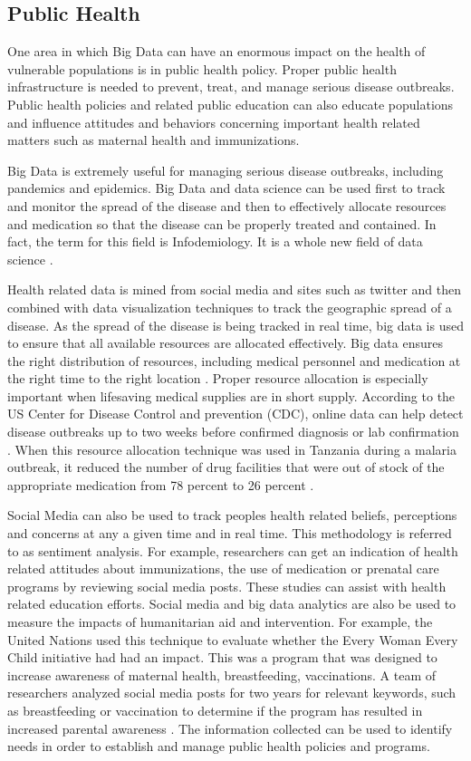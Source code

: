 \documentclass[sigconf]{acmart}
\begin{document}
\subsection{Public Health}
One area in which Big Data can have an enormous impact on the health of vulnerable populations is in public health policy. Proper public health infrastructure is needed to prevent, treat, and manage serious disease outbreaks. Public health policies and related public education can also educate populations and influence attitudes and behaviors concerning important health related matters such as maternal health and immunizations. 

Big Data is extremely useful for managing serious disease outbreaks, including pandemics and epidemics. Big Data and data science can be used first to track and monitor the spread of the disease and then to effectively allocate resources and medication so that the disease can be properly treated and contained. In fact, the term for this field is Infodemiology. It is a whole new field of data science \cite{www-google-GloPls}.

Health related data is mined from social media and sites such as twitter and then combined with data visualization techniques to track the geographic spread of a disease. As the spread of the disease is being tracked in real time, big data is used to ensure that all available resources are allocated effectively. Big data ensures the right distribution of resources, including medical personnel and medication at the right time to the right location \cite{www-google-Dataflo}. Proper resource allocation is especially important when lifesaving medical supplies are in short supply. According to the US Center for Disease Control and prevention (CDC), online data can help detect disease outbreaks up to two weeks before confirmed diagnosis or lab confirmation \cite{www-google-GloPls}.  When this resource allocation technique was used in Tanzania during a malaria outbreak, it reduced the number of drug facilities that were out of stock of the appropriate medication from 78 percent to 26 percent \cite{DevEcon}.

Social Media can also be used to track peoples health related beliefs, perceptions and concerns at any a given time and in real time. This methodology is referred to as sentiment analysis. For example, researchers can get an indication of health related attitudes about immunizations, the use of medication or prenatal care programs by reviewing social media posts.  These studies can assist with health related education efforts. Social media and big data analytics are also be used to measure the impacts of humanitarian aid and intervention. For example, the United Nations used this technique to evaluate whether the Every Woman Every Child initiative had had an impact. This was a program that was designed to increase awareness of maternal health, breastfeeding, vaccinations. A team of researchers analyzed social media posts for two years for relevant keywords, such as breastfeeding or vaccination to determine if the program has resulted in increased parental awareness \cite{DevEcon}. The information collected can be used to identify needs in order to establish and manage public health policies and programs.
\end{document}
